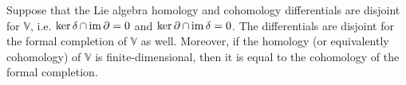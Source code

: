 \documentclass[12pt,a4paper,final]{report}
\begin{document}
\begin{proposition}
 Suppose that the Lie algebra homology and cohomology differentials are disjoint for $\mathbb{V}$, i.e. $\ker \operatorname{\delta} \cap \operatorname{\mathrm{im}} \operatorname{\partial} = 0$ and $\ker \operatorname{\partial} \cap \operatorname{\mathrm{im}} \operatorname{\delta} = 0$. The differentials are disjoint for the formal completion of $\mathbb{V}$ as well. Moreover, if the homology (or equivalently cohomology) of $\mathbb{V}$ is finite-dimensional, then it is equal to the cohomology of the formal completion.
\end{proposition}

%
%
%
%
%
\end{document}
